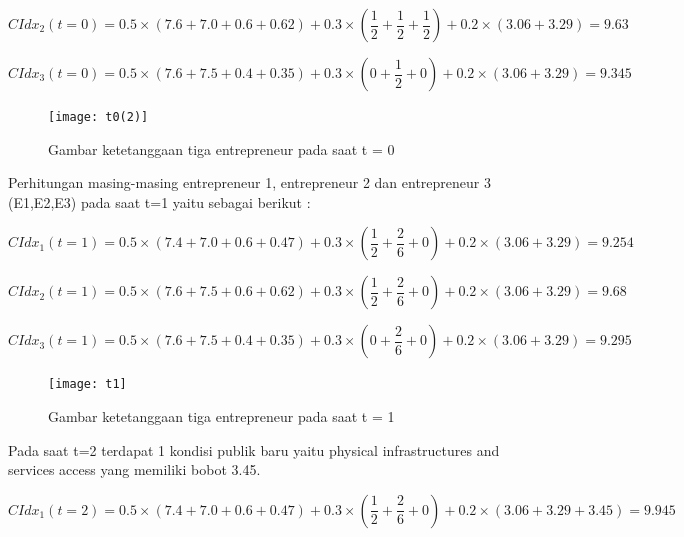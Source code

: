 \documentclass[a4paper,twoside]{article}
\begin{document}
\begin{enumerate}
\begin{equation}
	CIdx_{2}(t=0) = 0.5 \times (7.6 + 7.0 + 0.6 + 0.62) + 0.3 \times (\frac {1} {2} + \frac {1} {2} + \frac {1} {2}) + 0.2 \times (3.06 + 3.29) = 9.63
\end{equation}

\begin{equation}
	CIdx_{3}(t=0) = 0.5 \times (7.6 + 7.5 + 0.4 + 0.35) + 0.3 \times (0 + \frac {1} {2} + 0) + 0.2 \times (3.06 + 3.29) = 9.345
\end{equation}

	\begin{figure} [H]
		\centering  
		\texttt{[image: t0(2)]} 
		\caption[Gambar ketetanggaan tiga entrepreneur pada saat t = 0]{Gambar ketetanggaan tiga entrepreneur pada saat t = 0} 
		\label{fig:t0} 
	\end{figure}

Perhitungan masing-masing entrepreneur 1, entrepreneur 2 dan entrepreneur 3 (E1,E2,E3) pada saat t=1 yaitu sebagai berikut :

\begin{equation}
	CIdx_{1}(t=1) = 0.5 \times (7.4 + 7.0 + 0.6 + 0.47) + 0.3 \times (\frac {1} {2} + \frac {2} {6}  + 0) + 0.2 \times (3.06 + 3.29) = 9.254
\end{equation}

\begin{equation}
	CIdx_{2}(t=1) = 0.5 \times (7.6 + 7.5 + 0.6 + 0.62) + 0.3 \times (\frac {1} {2} + \frac {2} {6} + 0) + 0.2 \times (3.06 + 3.29) = 9.68
\end{equation}

\begin{equation}
	CIdx_{3}(t=1) = 0.5 \times (7.6 + 7.5 + 0.4 + 0.35) + 0.3 \times (0 + \frac {2} {6} + 0) + 0.2 \times (3.06 + 3.29) = 9.295
\end{equation}

	\begin{figure} [H]
		\centering  
		\texttt{[image: t1]} 
		\caption[Gambar ketetanggaan tiga entrepreneur pada saat t = 1]{Gambar ketetanggaan tiga entrepreneur pada saat t = 1} 
		\label{fig:t0} 
	\end{figure}

Pada saat t=2 terdapat 1 kondisi publik baru yaitu physical infrastructures and services access yang memiliki bobot 3.45.


\begin{equation}
	CIdx_{1}(t=2) = 0.5 \times (7.4 + 7.0 + 0.6 + 0.47) + 0.3 \times (\frac {1} {2} + \frac {2} {6}  + 0) + 0.2 \times (3.06 + 3.29 + 3.45) = 9.945
\end{equation}


\end{enumerate}
\end{document}

